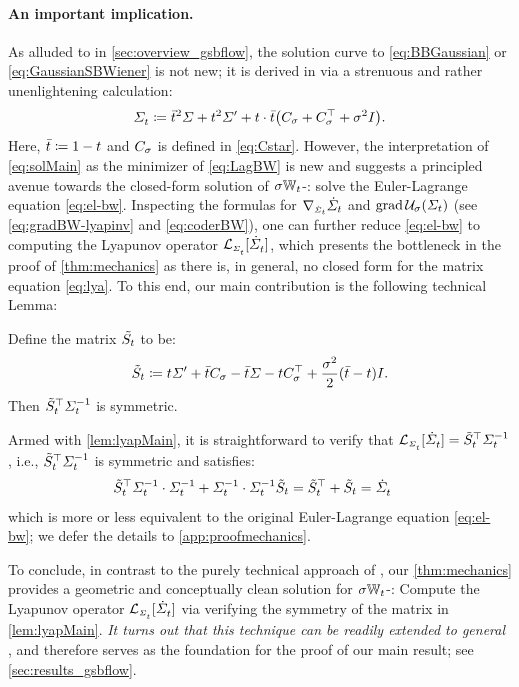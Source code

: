 \paragraph{An important implication.}
As alluded to in \cref{sec:overview_gsbflow}, the solution curve to \eqref{eq:BBGaussian} or \eqref{eq:GaussianSBWiener} is not new; it is derived in \citet{mallasto2021entropy} via a strenuous and rather unenlightening calculation:
\begin{equation}
\label{eq:solMain}
\Sigmasol \defeq \ctimebar^2 \Sigma + \ctime^2 \Sigma' + \ctime\cdot\ctimebar\parens*{\C+\C^\top+ \sigma^2 \eye}.
\end{equation}
Here, $\bar{t} \coloneqq 1-t$ and $C_{\sigma}$ is defined in \eqref{eq:Cstar}. However, the interpretation of \eqref{eq:solMain} as the minimizer of \eqref{eq:LagBW} is new and suggests a principled avenue towards the closed-form solution of $\sigma\mathbb{W}_{t}$-: solve the Euler-Lagrange equation \eqref{eq:el-bw}.
Inspecting the formulas for $\nabla_{\scriptscriptstyle\dot{\Sigma}_{t}}\dot{\Sigma}_{t}$ and $\gradBW \penergyBW$ (see \eqref{eq:gradBW-lyapinv} and \eqref{eq:coderBW}), one can further reduce \eqref{eq:el-bw} to computing the Lyapunov operator $\lyap$, which presents the bottleneck in the proof of \cref{thm:mechanics} as there is, in general, no closed form for the matrix equation \eqref{eq:lya}. To this end, our main contribution is the following technical Lemma:
\begin{lemma}\label{lem:lyapMain}
Define the matrix $\tilde{S_{t}}$ to be:
\begin{equation}
\label{eq:HtMain}
\tilde{S}_{t} \coloneqq t\Sigma' + \bar{t} C_{\sigma} - \bar{t}\Sigma - tC_{\sigma}^\top + \frac{\sigma^2}{2}(\bar{t}-t)I.
\end{equation}Then $\tilde{S}_{t}^\top\Sigma^{-1}_{ t }$ is symmetric.
\end{lemma}
Armed with \cref{lem:lyapMain}, it is straightforward to verify that $\lyap = \Ht^\top\Sigmasolinv$, i.e., $\tilde{S}_{t}^\top \Sigma^{-1}_{ t }$ is symmetric and satisfies:
\begin{align}
   \tilde{S}_{t}^\top\Sigma^{-1}_{ t } \cdot \Sigma^{-1}_{ t } + \Sigma^{-1}_{ t } \cdot\Sigma^{-1}_{ t } \tilde{S}_{t} &= \tilde{S}_{t}^\top +  \tilde{S}_{t}= \dot{\Sigma}^{}_{ t }
\end{align}which is more or less equivalent to the original Euler-Lagrange equation \eqref{eq:el-bw}; we defer the details to \cref{app:proofmechanics}.

To conclude, in contrast to the purely technical approach of \citet{mallasto2021entropy}, our \cref{thm:mechanics} provides a geometric and conceptually clean solution for $\sigma\mathbb{W}_{t}$-: Compute the Lyapunov operator $\lyap$ via verifying the symmetry of the matrix in \cref{lem:lyapMain}. \emph{It turns out that this technique can be readily extended to general }, and therefore serves as the foundation for the proof of our main result; see \cref{sec:results_gsbflow}.

